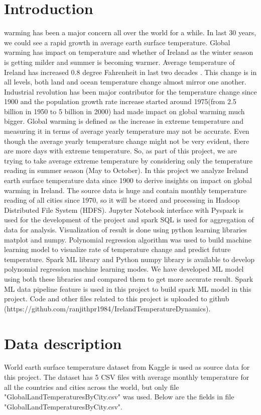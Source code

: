 \documentclass[journal,twoside,web]{ieeecolor}
\begin{document}
\section{Introduction}
\label{sec:introduction}
 warming has been a major concern all over the world for a while. In last 30 years, we could see a rapid growth in average earth surface temperature. Global warming has impact on temperature and whether of Ireland as the winter season is getting milder and summer is becoming warmer.  Average temperature of Ireland has increased 0.8 degree Fahrenheit in last two decades \cite{I1}. This change is in all levels, both land and ocean temperature change almost mirror one another.  Industrial revolution has been major contributor for the temperature change since 1900 and the population growth rate increase started around 1975(from 2.5 billion in 1950 to 5 billion in 2000) had made impact on global warming much bigger.   Global warming is defined as the increase in extreme temperature and measuring it in terms of average yearly temperature may not be accurate.  Even though the average yearly temperature change might not be very evident, there are more days with extreme temperature.  So, as part of this project, we are trying to take average extreme temperature by considering only the temperature reading in summer season (May to October).  In this project we analyze Ireland earth surface temperature data since 1900 to derive insights on impact on global warming in Ireland.  The source data is huge and contain monthly temperature reading of all cities since 1970, so it will be stored and processing in Hadoop Distributed File System (HDFS).  Jupyter Notebook interface with Pyspark is used for the development of the project and spark SQL is used for aggregation of data for analysis.  Visualization of result is done using python learning libraries matplot and numpy.  Polynomial regression algorithm  was used to build machine learning model to visualize rate of temperature change and predict future temperature.  Spark ML library and Python numpy library is available to develop polynomial regression machine learning modes.  We have developed ML model using both these libraries and compared them to get more accurate result.  Spark ML data pipeline feature is used in this project to build spark ML model in this project.  Code and other files related to this project is uploaded to github (https://github.com/ranjithpr1984/IrelandTemperatureDynamics).

\section{Data description}
World earth surface temperature dataset from Kaggle\cite{DATA} is used as source data for this project.  The dataset has 5 CSV files with average monthly temperature for all the countries and cities across the world, but only file "GlobalLandTemperaturesByCity.csv" was used.  Below are the fields in file "GlobalLandTemperaturesByCity.csv".
\end{document}
